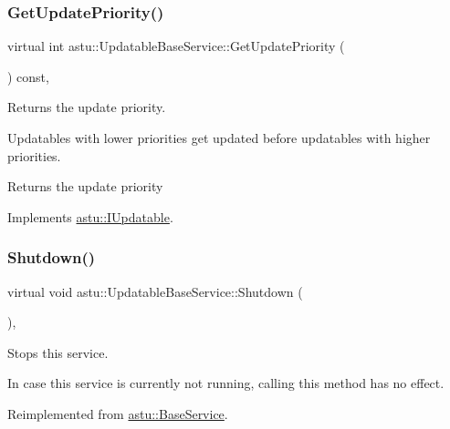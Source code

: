 \subsubsection{\texorpdfstring{Get\+Update\+Priority()}{GetUpdatePriority()}}
{\footnotesize\ttfamily virtual int astu\+::\+Updatable\+Base\+Service\+::\+Get\+Update\+Priority (\begin{DoxyParamCaption}{ }\end{DoxyParamCaption}) const\hspace{0.3cm}{\ttfamily [override]}, {\ttfamily [virtual]}}

Returns the update priority.

Updatables with lower priorities get updated before updatables with higher priorities.

\begin{DoxyReturn}{Returns}
the update priority 
\end{DoxyReturn}


Implements \hyperlink{classastu_1_1IUpdatable_a1bf76b0fce2360b8ade25ef9ae9e3065}{astu\+::\+I\+Updatable}.

\mbox{\label{classastu_1_1UpdatableBaseService_a7ad7e0201007878b6014361dd5ba82f9}} 
\subsubsection{\texorpdfstring{Shutdown()}{Shutdown()}}
{\footnotesize\ttfamily virtual void astu\+::\+Updatable\+Base\+Service\+::\+Shutdown (\begin{DoxyParamCaption}{ }\end{DoxyParamCaption})\hspace{0.3cm}{\ttfamily [override]}, {\ttfamily [virtual]}}

Stops this service.

In case this service is currently not running, calling this method has no effect. 

Reimplemented from \hyperlink{classastu_1_1BaseService_a7095888244052db294d58738c0d187fb}{astu\+::\+Base\+Service}.

\mbox{\label{classastu_1_1UpdatableBaseService_a47e3725f717cee3cd8983f485b2a0243}} 
